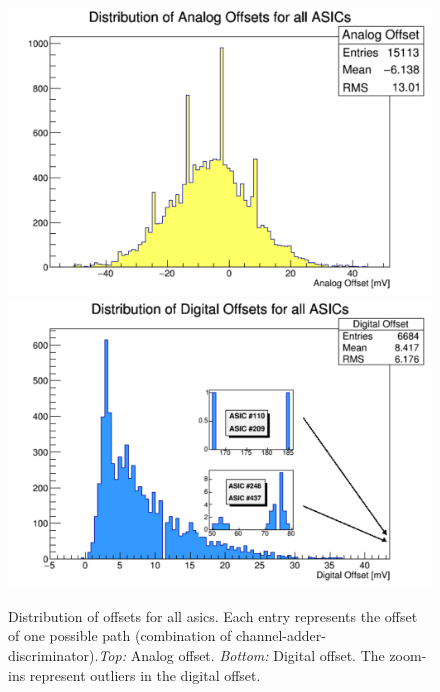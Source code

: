 \documentclass[main.tex]{subfiles}
\begin{document}
\begin{figure}[h]
  \centering
    \includegraphics[width=\textwidth]{./Pictures/analogdist.pdf}\\
  \endminipage
    \includegraphics[width=\textwidth]{./Pictures/digitaldist.pdf}
  \endminipage
  \caption{Distribution of offsets for all \glspl{asic}. Each entry represents the offset of one possible path (combination of channel-adder-discriminator).\textit{Top:} Analog offset. \textit{Bottom:} Digital offset. The zoom-ins represent outliers in the digital offset.}
  \label{fig:offsetdist}
\end{figure}
\end{document}
